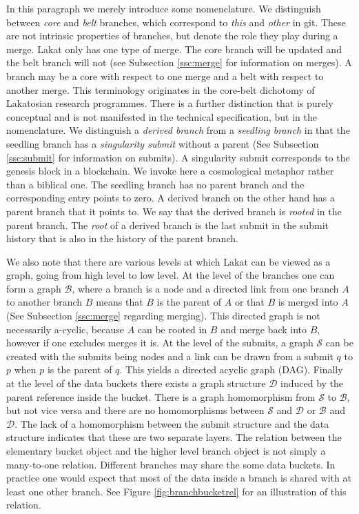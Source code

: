 In this paragraph we merely introduce some nomenclature. We distinguish between \textit{core} and \textit{belt} branches, which correspond to \textit{this} and \textit{other} in git. These are not intrinsic properties of branches, but denote the role they play during a merge. Lakat only has one type of merge. The core branch will be updated and the belt branch will not (see Subsection \ref{ssc:merge} for information on merges). A branch may be a core with respect to one merge and a belt with respect to another merge. This terminology originates in the core-belt dichotomy of Lakatosian research programmes. There is a further distinction that is purely conceptual and is not manifested in the technical specification, but in the nomenclature. We distinguish a \textit{derived branch} from a \textit{seedling branch} in that the seedling branch has a \textit{singularity submit} without a parent (See Subsection \ref{ssc:submit} for information on submits). A singularity submit corresponds to the genesis block in a blockchain. We invoke here a cosmological metaphor rather than a biblical one. The seedling branch has no parent branch and the corresponding entry points to zero. A derived branch on the other hand has a parent branch that it points to. We say that the derived branch is \textit{rooted} in the parent branch. The \textit{root} of a derived branch is the last submit in the submit history that is also in the history of the parent branch.

We also note that there are various levels at which Lakat can be viewed as a graph, going from high level to low level. At the level of the branches one can form a graph $\mathcal B$, where a branch is a node and a directed link from one branch $A$ to another branch $B$ means that $B$ is the parent of $A$ or that $B$ is merged into $A$ (See Subsection \ref{ssc:merge} regarding merging). This directed graph is not necessarily a-cyclic, because $A$ can be rooted in $B$ and merge back into $B$, however if one excludes merges it is. At the level of the submits, a graph $\mathcal S$ can be created with the submits being nodes and a link can be drawn from a submit $q$ to $p$ when $p$ is the parent of $q$. This yields a directed acyclic graph (DAG). Finally at the level of the data buckets there exists a graph structure $\mathcal D$ induced by the parent reference inside the bucket. There is a graph homomorphism from $\mathcal S$ to $\mathcal B$, but not vice versa and there are no homomorphisms between $\mathcal S$ and $\mathcal D$ or $\mathcal B$ and $\mathcal D$. The lack of a homomorphism between the submit structure and the data structure indicates that these are two separate layers. The relation between the elementary bucket object and the higher level branch object is not simply a many-to-one relation. Different branches may share the some data buckets. In practice one would expect that most of the data inside a branch is shared with at least one other branch. See Figure \ref{fig:branchbucketrel} for an illustration of this relation.



